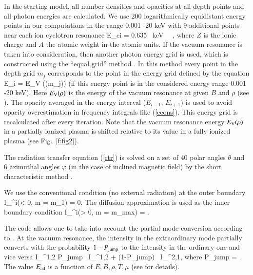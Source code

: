 \documentclass{aa}
\begin{document}
In the starting model, all number densities and opacities at all 
depth points and all photon energies are calculated. We use 200 
logarithmically equidistant energy points in our computations in the 
range 0.001 -20 keV with 9 additional points near each ion 
cyclotron resonance 
\be \label{ioncyc} 
    E_{\rm ci} = 0.635 \, {\rm keV} \,  
\, , \ee 
where $Z$ is the ionic charge and $A$ the atomic weight in the atomic units. 
If the vacuum resonance is taken into 
consideration, then 
another photon energy grid is used, which is constructed using the ``equal 
grid'' method \citep{Ho.Lai:03}.  In this method every point in the depth 
grid $m_j$ corresponds to the point in the energy grid 
defined by the equation 
\be 
E_i = E_{\rm V} (\rho(m_j)) 
\ee 
(if this energy 
point is in the considered energy range 0.001 -20 keV). 
Here $E_{\rm V}(\rho)$ is the energy of the vacuum resonance at 
given $B$ and $\rho$ (see \citealt{vAL:06}). 
The opacity averaged in the energy interval 
($E_{i-1}$, $E_{i+1}$) is used to avoid opacity overestimation 
in frequency integrals like (\ref{econs}). 
This energy grid is recalculated after every iteration. 
Note that the 
vacuum resonance energy $E_{\rm V}(\rho)$ in a partially ionized plasma 
is shifted relative to its value in a fully 
ionized plasma (see Fig.~\ref{f:fig2}). 
 
 
The radiation transfer 
equation (\ref{rtr}) is  solved on a set of 40 polar angles $\theta$ 
and 6 azimuthal angles $\varphi$ (in the case of inclined magnetic field) 
by the short characteristic method \citep{Ols.Kun:87}. 
 
We use the conventional condition (no external radiation) at the outer boundary 
\be 
    I_{\nu}^i(\mu < 0, m = m_1) = 0. 
\ee 
The diffusion approximation is used as the inner boundary condition 
\be  \label{in_b_c} 
 I_{\nu}^i(\mu > 0, m = m_{\rm max}) = . 
\ee 
 
The code allows one to take into account the partial mode conversion 
according to \cite{vAL:06}. At the 
vacuum resonance, the intensity in the extraordinary mode 
partially converts 
with the probability $1-P_{\rm jump}$ to the intensity in the ordinary one 
and vice versa 
\be \label{p_conv} 
I_{\nu}^{1,2} \to P_{\rm jump} \, I_{\nu}^{1,2} + (1-P_{\rm jump}) \, 
I_{\nu}^{2,1}, \ee 
where 
\be \label{pjump} 
      P_{\rm jump} = \exp {}. 
\ee 
The value $E_{\rm ad}$ is a function of $E,B,\rho,T,\mu$ (see 
\citealt{vAL:06} for details). 
 
\end{document}
